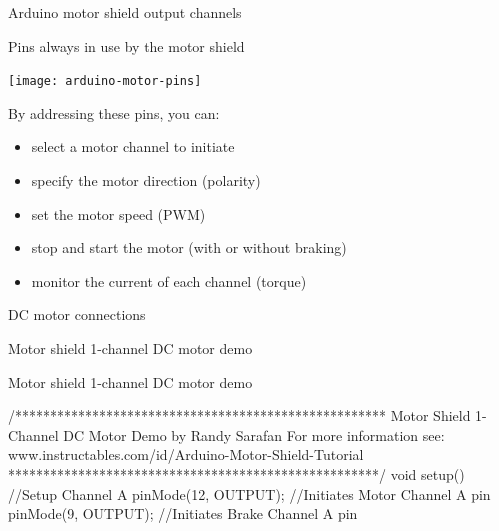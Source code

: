 \documentclass[compress]{beamer}
\begin{document}

{
    \begin{frame}{Arduino motor shield output channels}
    \end{frame}
}

    \begin{frame}{Pins always in use by the motor shield}

        \begin{center}
            \texttt{[image: arduino-motor-pins]}
        \end{center}
        By addressing these pins, you can:

        \begin{itemize}
            \item select a motor channel to initiate
            \item specify the motor direction (polarity)
            \item set the motor speed (PWM)
            \item stop and start the motor (with or without braking)
            \item monitor the current of each channel (torque)
        \end{itemize}
    \end{frame}

{
    \begin{frame}{DC motor connections}
    \end{frame}
}

{
    \begin{frame}{Motor shield 1-channel DC motor demo}
    \end{frame}
}

\begin{frame}[fragile]{Motor shield 1-channel DC motor demo}

\begin{cppcode}
/*****************************************************
Motor Shield 1-Channel DC Motor Demo
by Randy Sarafan
For more information see:
www.instructables.com/id/Arduino-Motor-Shield-Tutorial
*****************************************************/
void setup() {
//Setup Channel A
pinMode(12, OUTPUT); //Initiates Motor Channel A pin
pinMode(9, OUTPUT); //Initiates Brake Channel A pin
}
\end{cppcode}

\end{frame}
\end{document}
